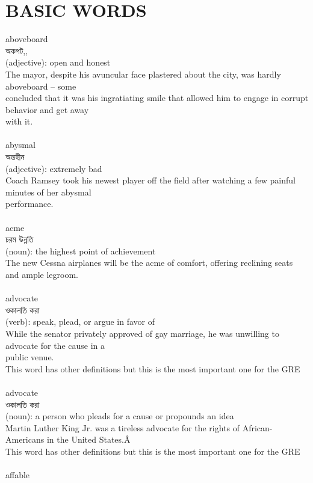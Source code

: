 \documentclass{article}
\begin{document}
\section{BASIC WORDS}
{aboveboard}\\
{অকপট,,}\\
{(adjective): open and honest\\The mayor, despite his avuncular face plastered about the city, was hardly aboveboard -- some\\concluded that it was his ingratiating smile that allowed him to engage in corrupt behavior and get away\\with it.\\}\\
{abysmal}\\
{অন্তহীন}\\
{(adjective): extremely bad\\Coach Ramsey took his newest player off the field after watching a few painful minutes of her abysmal\\performance.\\}\\
{acme}\\
{চরম উন্নতি}\\
{(noun): the highest point of achievement\\The new Cessna airplanes will be the acme of comfort, offering reclining seats and ample legroom.\\}\\
{advocate}\\
{ওকালতি করা}\\
{(verb): speak, plead, or argue in favor of\\While the senator privately approved of gay marriage, he was unwilling to advocate for the cause in a\\public venue.\\This word has other definitions but this is the most important one for the GRE\\}\\
{advocate}\\
{ওকালতি করা}\\
{(noun): a person who pleads for a cause or propounds an idea\\Martin Luther King Jr. was a tireless advocate for the rights of African-Americans in the United States.Â\\This word has other definitions but this is the most important one for the GRE\\}\\
{affable}\\
\end{document}
